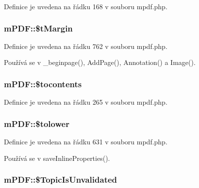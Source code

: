 Definice je uvedena na řádku 168 v souboru mpdf.\-php.

\hypertarget{classm_p_d_f_a7244f3ce63bb21f63eb09b32e91d3081}{
\subsubsection[{\$t\-Margin}]{\setlength{\rightskip}{0pt plus 5cm}m\-P\-D\-F\-::\$t\-Margin}}\label{classm_p_d_f_a7244f3ce63bb21f63eb09b32e91d3081}


Definice je uvedena na řádku 762 v souboru mpdf.\-php.



Používá se v \-\_\-beginpage(), Add\-Page(), Annotation() a Image().

\hypertarget{classm_p_d_f_ae64feec2722153ef89706333bab5f405}{
\subsubsection[{\$tocontents}]{\setlength{\rightskip}{0pt plus 5cm}m\-P\-D\-F\-::\$tocontents}}\label{classm_p_d_f_ae64feec2722153ef89706333bab5f405}


Definice je uvedena na řádku 265 v souboru mpdf.\-php.

\hypertarget{classm_p_d_f_afb2b28504c28ce77f9a2872b686eaa99}{
\subsubsection[{\$tolower}]{\setlength{\rightskip}{0pt plus 5cm}m\-P\-D\-F\-::\$tolower}}\label{classm_p_d_f_afb2b28504c28ce77f9a2872b686eaa99}


Definice je uvedena na řádku 631 v souboru mpdf.\-php.



Používá se v save\-Inline\-Properties().

\hypertarget{classm_p_d_f_af4dbb0ab9e250ef97ce69fcff51d3dad}{
\subsubsection[{\$\-Topic\-Is\-Unvalidated}]{\setlength{\rightskip}{0pt plus 5cm}m\-P\-D\-F\-::\$\-Topic\-Is\-Unvalidated}}\label{classm_p_d_f_af4dbb0ab9e250ef97ce69fcff51d3dad}


